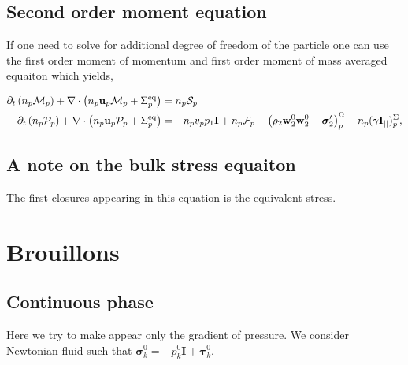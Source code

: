 \subsection*{Second order moment equation}

If one need to solve for additional degree of freedom of the particle one can use the first order moment of momentum and first order moment of mass averaged equaiton which yields, 

\begin{align}
    \partial_t \left(n_p \mathcal{M}_p\right)
    + \mathbf{\nabla}\cdot \left(
        n_p \textbf{u}_p \mathcal{M}_p
    + \Sigma_p^\text{eq}
    \right)
    &=
    n_p \mathcal{S}_p\\
    \partial_t \left(n_p \mathcal{P}_p\right)
    + \mathbf{\nabla}\cdot \left(
        n_p \textbf{u}_p \mathcal{P}_p
    + \Sigma_p^\text{eq}
    \right)
    &=
    -n_p v_p p_1 \textbf{I}
    + n_p \mathcal{F}_p
    + \left(
        \rho_2 \textbf{w}_2^0  \textbf{w}_2^0 
        - \bm{\sigma}_2'
    \right)^\Omega_p
    - n_p (\gamma \textbf{I}_{||})^\Sigma_p,
\end{align}

\subsection{A note on the bulk stress equaiton}
The first closures appearing in this equation is the equivalent stress. 
\section*{Brouillons }

\subsection{Continuous phase}
Here we try to make appear only the gradient of pressure. 
We consider Newtonian fluid such that $\bm{\sigma}_k^0 = -p^0_k \textbf{I} + \bm{\tau}_k^0$. 

